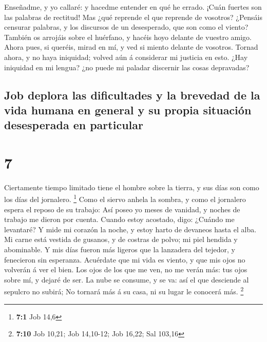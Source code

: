  Enseñadme, y yo callaré: y hacedme entender en qué he
errado.  ¡Cuán fuertes son las palabras de rectitud! Mas
¿qué reprende el que reprende de vosotros?  ¿Pensáis
censurar palabras, y los discursos de un desesperado, que son como el
viento?  También os arrojáis sobre el huérfano, y hacéis
hoyo delante de vuestro amigo.  Ahora pues, si queréis,
mirad en mí, y ved si miento delante de vosotros.  Tornad
ahora, y no haya iniquidad; volved aún á considerar mi justicia en esto.
 ¿Hay iniquidad en mi lengua? ¿no puede mi paladar
discernir las cosas depravadas?

\hypertarget{job-deplora-las-dificultades-y-la-brevedad-de-la-vida-humana-en-general-y-su-propia-situaciuxf3n-desesperada-en-particular}{%
\subsection{Job deplora las dificultades y la brevedad de la vida humana
en general y su propia situación desesperada en
particular}\label{job-deplora-las-dificultades-y-la-brevedad-de-la-vida-humana-en-general-y-su-propia-situaciuxf3n-desesperada-en-particular}}

\hypertarget{section-6}{%
\section{7}\label{section-6}}

 Ciertamente tiempo limitado tiene el hombre sobre la
tierra, y sus días son como los días del jornalero. \footnote{\textbf{7:1}
  Job 14,6}  Como el siervo anhela la sombra, y como el
jornalero espera el reposo de su trabajo:  Así poseo yo
meses de vanidad, y noches de trabajo me dieron por cuenta. 
Cuando estoy acostado, digo: ¿Cuándo me levantaré? Y mide mi corazón la
noche, y estoy harto de devaneos hasta el alba.  Mi carne
está vestida de gusanos, y de costras de polvo; mi piel hendida y
abominable.  Y mis días fueron más ligeros que la lanzadera
del tejedor, y fenecieron sin esperanza.  Acuérdate que mi
vida es viento, y que mis ojos no volverán á ver el bien. 
Los ojos de los que me ven, no me verán más: tus ojos sobre mí, y dejaré
de ser.  La nube se consume, y se va: así el que desciende
al sepulcro no subirá;  No tornará más á su casa, ni su
lugar le conocerá más. \footnote{\textbf{7:10} Job 10,21; Job 14,10-12;
  Job 16,22; Sal 103,16}

